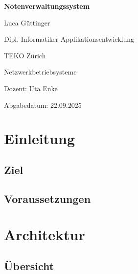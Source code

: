 \documentclass[11pt]{article}
\begin{document}
    \hypersetup{pageanchor=false}
    \begin{titlepage}
        \centering
        {\huge\bfseries Notenverwaltungssystem \par}
        \vspace{2cm}
        {\Large Luca Güttinger \par}
        \vspace{0.5cm}
        {\Large Dipl. Informatiker Applikationsentwicklung \par}
        \vspace{0.5cm}
        {\Large TEKO Zürich \par}
        \vspace{0.5cm}
        {\Large Netzwerkbetriebsysteme \par}
        {\Large Dozent: Uta Enke \par}
        \vspace{0.5cm}
        {\Large Abgabedatum: 22.09.2025 \par}
        \vfill
    \end{titlepage}
    \clearpage
    \hypersetup{pageanchor=true}

    \tableofcontents
    \newpage


    \section{Einleitung}

    \subsection{Ziel}

    \subsection{Voraussetzungen}


    \section{Architektur}

    \subsection{Übersicht}
\end{document}
